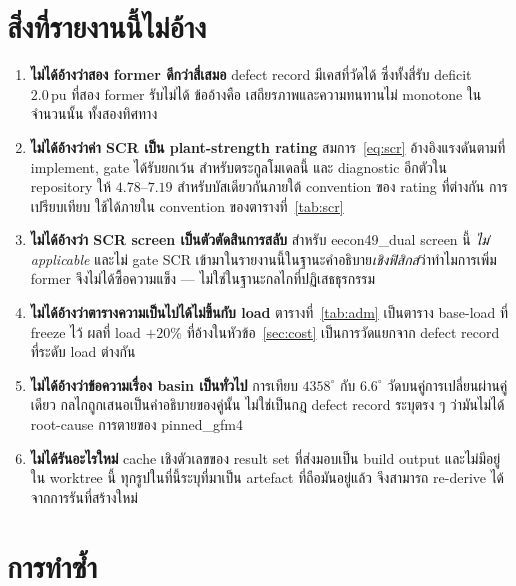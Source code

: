 \documentclass[12pt,a4paper]{article}
\theoremstyle{remark}
\newcommand{\pu}{\,\mathrm{pu}}
\newcommand{\code}[1]{{\ttfamily\small\hyphenchar\font=-1 #1}}
\begin{document}
\section{สิ่งที่รายงานนี้ไม่อ้าง}\label{sec:notclaimed}

\begin{enumerate}[leftmargin=1.9em,itemsep=2.5pt]
\item \textbf{ไม่ได้อ้างว่าสอง former ดีกว่าสี่เสมอ} defect record มีเคสที่วัดได้
      ซึ่งทั้งสี่รับ deficit $2.0\pu$ ที่สอง former รับไม่ได้ ข้ออ้างคือ
      เสถียรภาพและความทนทานไม่ monotone ในจำนวนนั้น ทั้งสองทิศทาง
\item \textbf{ไม่ได้อ้างว่าค่า SCR เป็น plant-strength rating}
      สมการ~\eqref{eq:scr} อ้างอิงแรงดันตามที่ implement, gate ได้รับยกเว้น
      สำหรับตระกูลโมเดลนี้ และ diagnostic อีกตัวใน repository ให้ $4.78$--$7.19$
      สำหรับบัสเดียวกันภายใต้ convention ของ rating ที่ต่างกัน การเปรียบเทียบ
      ใช้ได้ภายใน convention ของตารางที่~\ref{tab:scr}
\item \textbf{ไม่ได้อ้างว่า SCR screen เป็นตัวตัดสินการสลับ} สำหรับ
      \code{eecon49\_dual} screen นี้ \emph{ไม่ applicable} และไม่ gate
      SCR เข้ามาในรายงานนี้ในฐานะคำอธิบาย\emph{เชิงฟิสิกส์}ว่าทำไมการเพิ่ม
      former จึงไม่ได้ซื้อความแข็ง --- ไม่ใช่ในฐานะกลไกที่ปฏิเสธธุรกรรม
\item \textbf{ไม่ได้อ้างว่าตารางความเป็นไปได้ไม่ขึ้นกับ load}
      ตารางที่~\ref{tab:adm} เป็นตาราง base-load ที่ freeze ไว้ ผลที่ load
      $+20\%$ ที่อ้างในหัวข้อ~\ref{sec:cost} เป็นการวัดแยกจาก defect record
      ที่ระดับ load ต่างกัน
\item \textbf{ไม่ได้อ้างว่าข้อความเรื่อง basin เป็นทั่วไป} การเทียบ
      $4358^{\circ}$ กับ $6.6^{\circ}$ วัดบนคู่การเปลี่ยนผ่านคู่เดียว
      กลไกถูกเสนอเป็นคำอธิบายของคู่นั้น ไม่ใช่เป็นกฎ defect record ระบุตรง ๆ
      ว่ามันไม่ได้ root-cause การตายของ \code{pinned\_gfm4}
\item \textbf{ไม่ได้รันอะไรใหม่} cache เชิงตัวเลขของ result set ที่ส่งมอบเป็น
      build output และไม่มีอยู่ใน worktree นี้ ทุกรูปในที่นี้ระบุที่มาเป็น
      artefact ที่ถือมันอยู่แล้ว จึงสามารถ re-derive ได้จากการรันที่สร้างใหม่
\end{enumerate}

\section{การทำซ้ำ}\label{sec:repro}
\end{document}

